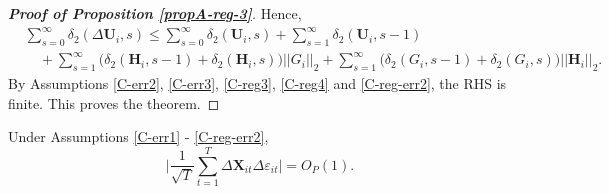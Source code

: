 \documentclass[a4paper,12pt]{article}
\begin{document}
\begin{proof}[\textnormal{\textbf{Proof of Proposition \ref{propA-reg-3}}}]
%
%

Hence,
\begin{align*}
 &\sum_{s=0}^\infty \delta_2(\Delta \mathbf{U}_i, s) \leq \sum_{s=0}^\infty \delta_2(\mathbf{U}_i, s) + \sum_{s=1}^\infty\delta_2(\mathbf{U}_i, s-1)  \\
 &\quad + \sum_{s=1}^\infty\big(\delta_2(\mathbf{H}_i, s-1) +  \delta_2(\mathbf{H}_i, s)\big) ||G_i ||_2 + \sum_{s=1}^\infty\big( \delta_2(G_i, s-1) +  \delta_2(G_i, s)\big)||\mathbf{H}_i ||_2.
\end{align*}
By Assumptions \ref{C-err2}, \ref{C-err3}, \ref{C-reg3}, \ref{C-reg4} and \ref{C-reg-err2}, the RHS is finite. This proves the theorem. 
\end{proof}


\begin{propA}\label{propA-reg-4}
Under Assumptions \ref{C-err1} - \ref{C-reg-err2},
\[ \Big| \frac{1}{\sqrt{T}}\sum_{t=1}^T \Delta \mathbf{X}_{it}\Delta \varepsilon_{it} \Big| = O_P(1).
\]
\end{propA}
\end{document}
